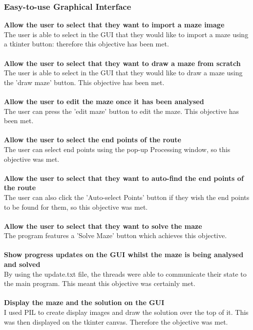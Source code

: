 \documentclass[titlepage]{article}
\begin{document}
\subsubsection{Easy-to-use Graphical Interface}
\textbf{Allow the user to select that they want to import a maze image}\\
The user is able to select in the GUI that they would like to import a maze using a tkinter button: therefore this objective has been met.\\\\
\textbf{Allow the user to select that they want to draw a maze from scratch}\\
The user is able to select in the GUI that they would like to draw a maze using the 'draw maze' button. This objective has been met.\\\\
\textbf{Allow the user to edit the maze once it has been analysed}\\
The user can press the 'edit maze' button to edit the maze. This objective has been met.\\\\
\textbf{Allow the user to select the end points of the route}\\
The user can select end points using the pop-up Processing window, so this objective was met.\\\\
\textbf{Allow the user to select that they want to auto-find the end points of the route}\\
The user can also click the 'Auto-select Points' button if they wish the end points to be found for them, so this objective was met.\\\\
\textbf{Allow the user to select that they want to solve the maze}\\
The program features a 'Solve Maze' button which achieves this objective.\\\\
\textbf{Show progress updates on the GUI whilst the maze is being analysed and solved}\\
By using the update.txt file, the threads were able to communicate their state to the main program. This meant this objective was certainly met.\\\\
\textbf{Display the maze and the solution on the GUI}\\
I used PIL to create display images and draw the solution over the top of it. This was then displayed on the tkinter canvas. Therefore the objective was met.\\\\
\end{document}
